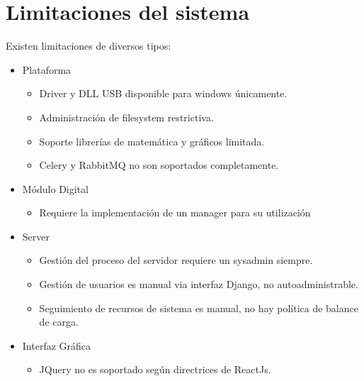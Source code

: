\section{Limitaciones del sistema}

Existen limitaciones de diversos tipos:

\begin{itemize}
    \item Plataforma
    \begin{itemize}
    \item Driver y DLL USB disponible para windows \'unicamente.
    \item Administraci\'on de filesystem restrictiva. 
    \item Soporte librer\'ias de matem\'atica y gr\'aficos limitada.
    \item Celery y RabbitMQ no son soportados completamente.
    \end{itemize}
    \item M\'odulo Digital
    \begin{itemize}
        \item Requiere la implementaci\'on de un manager para su utilizaci\'on
    \end{itemize}
    \item Server
    \begin{itemize}
        \item Gesti\'on del proceso del servidor requiere un sysadmin siempre.
        \item Gesti\'on de usuarios es manual via interfaz Django, no autoadministrable.
        \item Seguimiento de recursos de sistema es manual, no hay pol\'itica de balance de carga.
    \end{itemize}
    \item Interfaz Gr\'afica
    \begin{itemize} 
        \item JQuery no es soportado seg\'un directrices de ReactJs.
    \end{itemize}
\end{itemize}
\newpage
